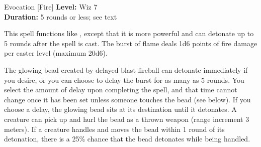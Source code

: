 {Evocation [Fire]}
{
	\textbf{Level:}
	Wiz 7\\
	\textbf{Duration:}
	5 rounds or less; see text\\
}
{
	This spell functions like , except that it is more powerful and can detonate up to 5 rounds after the spell is cast. The burst of flame deals 1d6 points of fire damage per caster level (maximum 20d6).

	The glowing bead created by delayed blast fireball can detonate immediately if you desire, or you can choose to delay the burst for as many as 5 rounds. You select the amount of delay upon completing the spell, and that time cannot change once it has been set unless someone touches the bead (see below). If you choose a delay, the glowing bead sits at its destination until it detonates. A creature can pick up and hurl the bead as a thrown weapon (range increment 3 meters). If a creature handles and moves the bead within 1 round of its detonation, there is a 25\% chance that the bead detonates while being handled.

}
